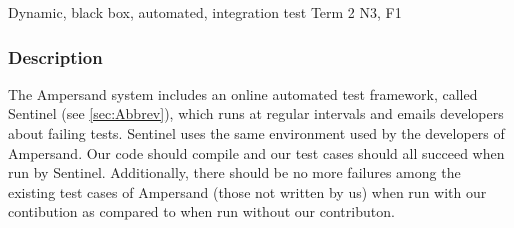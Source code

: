 \documentclass[12pt]{report}
\begin{document}
{Dynamic, black box, automated, integration test}
{Term 2}
{N3, F1}
\vspace{-12pt}\subsubsection*{Description}

The Ampersand system includes an online automated test framework, called
Sentinel (see \ref{sec:Abbrev}), which runs at regular intervals and emails
developers about failing tests. Sentinel uses the same environment used by the
developers of Ampersand. Our code should compile and our test cases should all
succeed when run by Sentinel. Additionally, there should be no more failures
among the existing test cases of Ampersand (those not written by us) when run
with our contibution as compared to when run without our contributon. 
		
		

\end{document}

